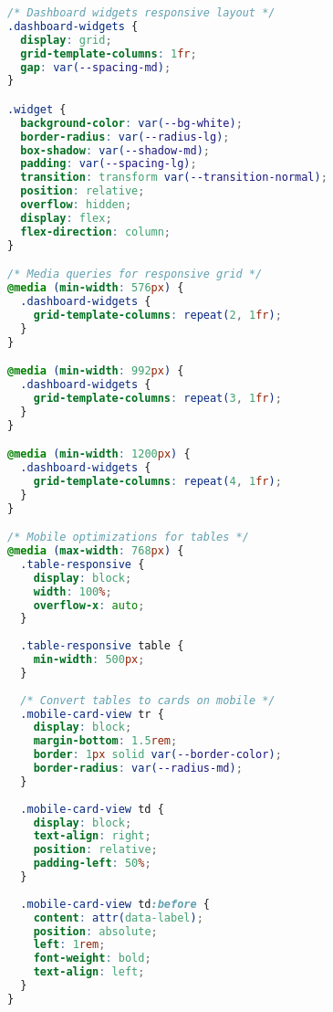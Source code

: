 \begin{lstlisting}[language=CSS, caption=Responsive Dashboard CSS]
/* Dashboard widgets responsive layout */
.dashboard-widgets {
  display: grid;
  grid-template-columns: 1fr;
  gap: var(--spacing-md);
}

.widget {
  background-color: var(--bg-white);
  border-radius: var(--radius-lg);
  box-shadow: var(--shadow-md);
  padding: var(--spacing-lg);
  transition: transform var(--transition-normal);
  position: relative;
  overflow: hidden;
  display: flex;
  flex-direction: column;
}

/* Media queries for responsive grid */
@media (min-width: 576px) {
  .dashboard-widgets {
    grid-template-columns: repeat(2, 1fr);
  }
}

@media (min-width: 992px) {
  .dashboard-widgets {
    grid-template-columns: repeat(3, 1fr);
  }
}

@media (min-width: 1200px) {
  .dashboard-widgets {
    grid-template-columns: repeat(4, 1fr);
  }
}

/* Mobile optimizations for tables */
@media (max-width: 768px) {
  .table-responsive {
    display: block;
    width: 100%;
    overflow-x: auto;
  }
  
  .table-responsive table {
    min-width: 500px;
  }
  
  /* Convert tables to cards on mobile */
  .mobile-card-view tr {
    display: block;
    margin-bottom: 1.5rem;
    border: 1px solid var(--border-color);
    border-radius: var(--radius-md);
  }
  
  .mobile-card-view td {
    display: block;
    text-align: right;
    position: relative;
    padding-left: 50%;
  }
  
  .mobile-card-view td:before {
    content: attr(data-label);
    position: absolute;
    left: 1rem;
    font-weight: bold;
    text-align: left;
  }
}
\end{lstlisting}